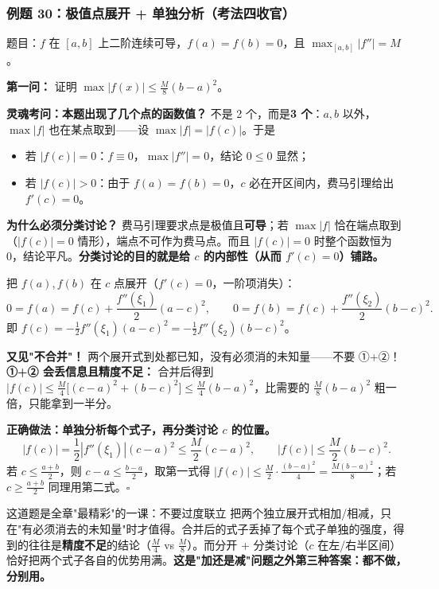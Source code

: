 \documentclass[a4paper]{article}
\begin{document}
\subsubsection{例题 30：极值点展开 + 单独分析（考法四收官）}

题目：$f$ 在 $[a,b]$ 上二阶连续可导，$f(a)=f(b)=0$，且 $\max_{[a,b]}|f''|=M$。

\textbf{第一问：} 证明 $\max|f(x)|\le \frac{M}{8}(b-a)^2$。

\textbf{灵魂考问：本题出现了几个点的函数值？} 不是 2 个，而是\textbf{3 个}：$a,b$ 以外，$\max|f|$ 也在某点取到——设 $\max|f|=|f(c)|$。于是
\begin{itemize}
\item 若 $|f(c)|=0$：$f\equiv0$，$\max|f''|=0$，结论 $0\le0$ 显然；
\item 若 $|f(c)|>0$：由于 $f(a)=f(b)=0$，$c$ 必在开区间内，费马引理给出 $f'(c)=0$。
\end{itemize}

\textbf{为什么必须分类讨论？} 费马引理要求点是极值且\textbf{可导}；若 $\max|f|$ 恰在端点取到（$|f(c)|=0$ 情形），端点不可作为费马点。而且 $|f(c)|=0$ 时整个函数恒为 0，结论平凡。\textbf{分类讨论的目的就是给 $c$ 的内部性（从而 $f'(c)=0$）铺路。}

把 $f(a),f(b)$ 在 $c$ 点展开（$f'(c)=0$，一阶项消失）：
\[
0=f(a)=f(c)+\frac{f''(\xi_1)}2(a-c)^2,\qquad 0=f(b)=f(c)+\frac{f''(\xi_2)}2(b-c)^2.
\]
即 $f(c)=-\frac12 f''(\xi_1)(a-c)^2=-\frac12 f''(\xi_2)(b-c)^2$。

\textbf{又见"不合并"！} 两个展开式到处都已知，没有必须消的未知量——不要 ①+②！\textbf{①+② 会丢信息且精度不足：} 合并后得到 $|f(c)|\le\frac{M}{4}\big[(c-a)^2+(b-c)^2\big]\le\frac{M}{4}(b-a)^2$，比需要的 $\frac{M}{8}(b-a)^2$ 粗一倍，只能拿到一半分。

\textbf{正确做法：单独分析每个式子，再分类讨论 $c$ 的位置。}
\[
|f(c)|=\frac12|f''(\xi_1)|(c-a)^2\le\frac{M}{2}(c-a)^2,\qquad |f(c)|\le\frac{M}{2}(b-c)^2.
\]
若 $c\le\frac{a+b}{2}$，则 $c-a\le\frac{b-a}{2}$，取第一式得 $|f(c)|\le\frac{M}{2}\cdot\frac{(b-a)^2}{4}=\frac{M(b-a)^2}{8}$；若 $c\ge\frac{a+b}{2}$ 同理用第二式。$\square$

\begin{importantbox}{这道题是全章"最精彩"的一课：不要过度联立}
把两个独立展开式相加/相减，只在"有必须消去的未知量"时才值得。合并后的式子丢掉了每个式子单独的强度，得到的往往是\textbf{精度不足}的结论（$\frac M4$ vs $\frac M8$）。而分开 + 分类讨论（$c$ 在左/右半区间）恰好把两个式子各自的优势用满。\textbf{这是"加还是减"问题之外第三种答案：都不做，分别用。}
\end{importantbox}
\end{document}
